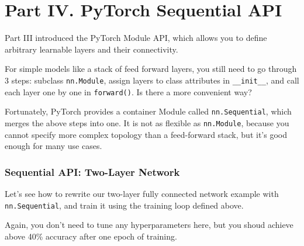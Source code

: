 \documentclass[11pt]{article}
\begin{document}
    \hypertarget{part-iv.-pytorch-sequential-api}{%
\section{Part IV. PyTorch Sequential
API}\label{part-iv.-pytorch-sequential-api}}

Part III introduced the PyTorch Module API, which allows you to define
arbitrary learnable layers and their connectivity.

For simple models like a stack of feed forward layers, you still need to
go through 3 steps: subclass \texttt{nn.Module}, assign layers to class
attributes in \texttt{\_\_init\_\_}, and call each layer one by one in
\texttt{forward()}. Is there a more convenient way?

Fortunately, PyTorch provides a container Module called
\texttt{nn.Sequential}, which merges the above steps into one. It is not
as flexible as \texttt{nn.Module}, because you cannot specify more
complex topology than a feed-forward stack, but it's good enough for
many use cases.

\hypertarget{sequential-api-two-layer-network}{%
\subsubsection{Sequential API: Two-Layer
Network}\label{sequential-api-two-layer-network}}

Let's see how to rewrite our two-layer fully connected network example
with \texttt{nn.Sequential}, and train it using the training loop
defined above.

Again, you don't need to tune any hyperparameters here, but you shoud
achieve above 40\% accuracy after one epoch of training.
\end{document}
